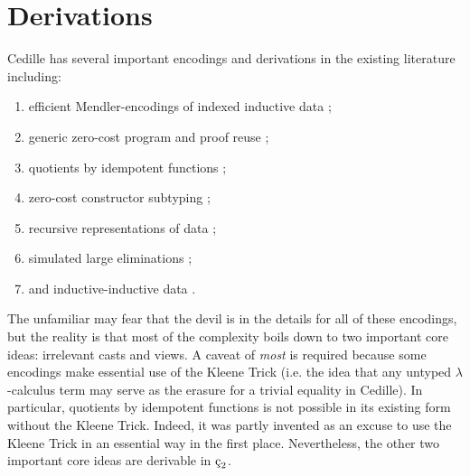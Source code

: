 \section{Derivations}

Cedille has several important encodings and derivations in the existing literature including:
\begin{enumerate}
    \item efficient Mendler-encodings of indexed inductive data \cite{firsov2018_mendler};
    \item generic zero-cost program and proof reuse \cite{diehl2018_generic_reuse};
    \item quotients by idempotent functions \cite{marmaduke2020quotients};
    \item zero-cost constructor subtyping \cite{marmaduke2020_constructor_subtyping};
    \item recursive representations of data \cite{jenkins2021monotone_recursive_types};
    \item simulated large eliminations \cite{jenkins2021_large_elim};
    \item and inductive-inductive data \cite{marmaduke2023_indind}.
\end{enumerate}
The unfamiliar may fear that the devil is in the details for all of these encodings, but the reality is that most of the complexity boils down to two important core ideas: irrelevant casts and views.
A caveat of \textit{most} is required because some encodings make essential use of the Kleene Trick (i.e. the idea that any untyped $\lambda$-calculus term may serve as the erasure for a trivial equality in Cedille).
In particular, quotients by idempotent functions is not possible in its existing form without the Kleene Trick.
Indeed, it was partly invented as an excuse to use the Kleene Trick in an essential way in the first place.
Nevertheless, the other two important core ideas are derivable in $\ced$.


